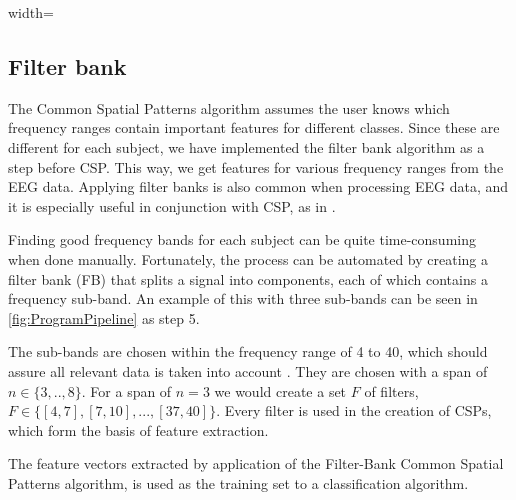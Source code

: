 \begin {figure*}
\begin{adjustbox}{width=\textwidth}
\end{adjustbox}
\caption{Overview of program pipeline}
\label{fig:ProgramPipeline}
\end{figure*}
\subsection{Filter bank}\label{sec:filterbank}
The Common Spatial Patterns algorithm assumes the user knows which frequency ranges contain important features for different classes. Since these are different for each subject, we have implemented the filter bank algorithm as a step before CSP. This way, we get features for various frequency ranges from the EEG data. Applying filter banks is also common when processing EEG data, and it is especially useful in conjunction with CSP, as in \cite{ang2008filter}. 

Finding good frequency bands for each subject can be quite time-consuming when done manually. Fortunately, the process can be automated by creating a filter bank (FB) that splits a signal into components, each of which contains a frequency sub-band. An example of this with three sub-bands can be seen in \cref{fig:ProgramPipeline} as step 5.

The sub-bands are chosen within the frequency range of 4 to 40, which should assure all relevant data is taken into account \citep{pfurtscheller1999event}. They are chosen with a span of $n \in \{3,..,8\}$. For a span of $n = 3$ we would create a set $F$ of filters, $F \in \{[4, 7], [7, 10],...,[37, 40]\}$. Every filter is used in the creation of CSPs, which form the basis of feature extraction.

The feature vectors extracted by application of the Filter-Bank Common Spatial Patterns algorithm, is used as the training set to a classification algorithm.
